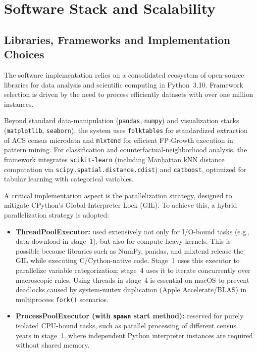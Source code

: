 \chapter{Software Stack and Scalability}
\label{app:software-stack}

\section{Libraries, Frameworks and Implementation Choices}
\label{app:libraries-frameworks}

The software implementation relies on a consolidated ecosystem of open-source libraries for data analysis and scientific computing in Python~3.10.
Framework selection is driven by the need to process efficiently datasets with over one million instances.

Beyond standard data-manipulation (\texttt{pandas}, \texttt{numpy}) and visualization stacks (\texttt{matplotlib}, \texttt{seaborn}), the system uses \texttt{folktables} for standardized extraction of ACS census microdata and \texttt{mlxtend} for efficient FP-Growth execution in pattern mining.
For classification and counterfactual-neighborhood analysis, the framework integrates \texttt{scikit-learn} (including Manhattan kNN distance computation via \texttt{scipy.spatial.distance.cdist}) and \texttt{catboost}, optimized for tabular learning with categorical variables.

A critical implementation aspect is the parallelization strategy, designed to mitigate CPython's Global Interpreter Lock (GIL).
To achieve this, a hybrid parallelization strategy is adopted:
\begin{itemize}
  \item \textbf{ThreadPoolExecutor:} used extensively not only for I/O-bound tasks (e.g., data download in stage~1), but also for compute-heavy kernels. This is possible because libraries such as NumPy, pandas, and mlxtend release the GIL while executing C/Cython-native code. Stage~1 uses this executor to parallelize variable categorization; stage~4 uses it to iterate concurrently over macroscopic rules. Using threads in stage~4 is essential on macOS to prevent deadlocks caused by system-mutex duplication (Apple Accelerate/BLAS) in multiprocess \texttt{fork()} scenarios.
  \item \textbf{ProcessPoolExecutor (with \texttt{spawn} start method):} reserved for purely isolated CPU-bound tasks, such as parallel processing of different census years in stage~1, where independent Python interpreter instances are required without shared memory.
\end{itemize}

